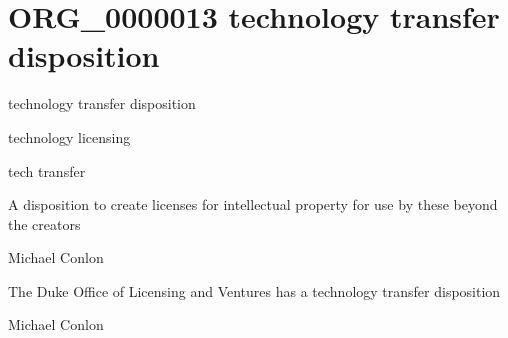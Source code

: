 \documentclass[letterpaper,10pt,english]{sphinxmanual}
\begin{document}
\section{ORG\_0000013 \sphinxhyphen{} technology transfer disposition}
\label{\detokenize{doc-ORG_0000013:org-0000013-technology-transfer-disposition}}\label{\detokenize{doc-ORG_0000013:index-0}}\label{\detokenize{doc-ORG_0000013::doc}}
\begin{sphinxShadowBox}

\sphinxAtStartPar
technology transfer disposition
\end{sphinxShadowBox}

\begin{sphinxShadowBox}

\sphinxAtStartPar
technology licensing

\sphinxAtStartPar
tech transfer
\end{sphinxShadowBox}

\begin{sphinxShadowBox}

\sphinxAtStartPar
A disposition to create licenses for intellectual property for use by these beyond the creators
\end{sphinxShadowBox}

\begin{sphinxShadowBox}

\sphinxAtStartPar
Michael Conlon 
\end{sphinxShadowBox}

\begin{sphinxShadowBox}

\sphinxAtStartPar
The Duke Office of Licensing and Ventures has a technology transfer disposition
\end{sphinxShadowBox}

\begin{sphinxShadowBox}

\sphinxAtStartPar
Michael Conlon 
\end{sphinxShadowBox}
\begin{quote}
\label{\detokenize{doc-ORG_0000014:org-0000014}}\label{\detokenize{doc-ORG_0000014:philanthropy-disposition}}\label{\detokenize{doc-ORG_0000014:org-0000014}}
\ignorespaces \end{quote}
\end{document}
